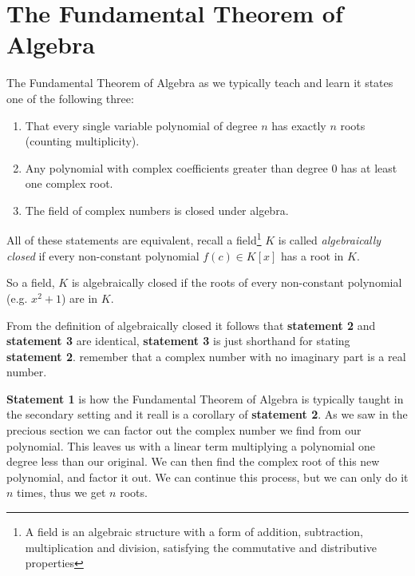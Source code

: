 \documentclass[12pt]{article}
\begin{document}





\section*{The Fundamental Theorem of Algebra}
The Fundamental Theorem of Algebra as we typically teach and learn it states one of the following three: 
\begin{enumerate}
\item That every single variable polynomial of degree $n$ has exactly $n$ roots (counting multiplicity).
\item Any polynomial with complex coefficients greater than degree 0 has at least one complex root.  
\item The field of complex numbers is closed under algebra.
\end{enumerate}

All of these statements are equivalent, recall a field\footnote{A field is an algebraic structure with a form of addition, subtraction, multiplication and division, satisfying the commutative and distributive properties} $K$ is called \emph{algebraically closed} if every non-constant polynomial $f(c) \in K[x]$ has a root in $K$.

So a field, $K$ is algebraically closed if the roots of every non-constant polynomial (e.g. $x^2+1$) are in $K$.


From the definition of algebraically closed it follows that \textbf{statement 2} and \textbf{statement 3} are identical, \textbf{statement 3} is just shorthand for stating \textbf{statement 2}. remember that a complex number with no imaginary part is a real number.

\textbf{Statement 1} is how the Fundamental Theorem of Algebra is typically taught in the secondary setting and it reall is a corollary of \textbf{statement 2}.  As we saw in the precious section we can factor out the complex number we find from our polynomial.  This leaves us with a linear term multiplying a polynomial one degree less than our original.  We can then find the complex root of this new polynomial, and factor it out.  We can continue this process, but we can only do it $n$ times, thus we get $n$ roots.
\end{document}
